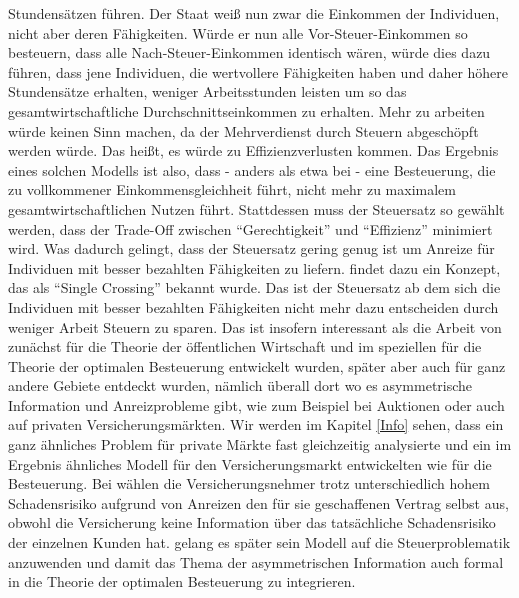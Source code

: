 Stundensätzen führen. Der Staat weiß nun zwar die Einkommen der Individuen, nicht aber deren Fähigkeiten. Würde er nun alle Vor-Steuer-Einkommen so besteuern, dass alle Nach-Steuer-Einkommen identisch wären, würde dies dazu führen, dass jene Individuen, die wertvollere Fähigkeiten haben und daher höhere Stundensätze erhalten, weniger Arbeitsstunden leisten um so das gesamtwirtschaftliche Durchschnittseinkommen zu erhalten. Mehr zu arbeiten würde keinen Sinn machen, da der Mehrverdienst durch Steuern abgeschöpft werden würde. Das heißt, es würde zu Effizienzverlusten kommen. Das Ergebnis eines solchen Modells ist also, dass - anders als etwa bei \Textcite{Pigou1920} - eine Besteuerung, die zu vollkommener Einkommensgleichheit führt, nicht mehr zu maximalem gesamtwirtschaftlichen Nutzen führt. Stattdessen muss der Steuersatz so gewählt werden, dass der Trade-Off zwischen "`Gerechtigkeit"' und "`Effizienz"' minimiert wird. Was dadurch gelingt, dass der Steuersatz gering genug ist um Anreize für Individuen mit besser bezahlten Fähigkeiten zu liefern. \textcite{Mirrlees1971} findet dazu ein Konzept, das als "`Single Crossing"' bekannt wurde. Das ist der Steuersatz ab dem sich die Individuen mit besser bezahlten Fähigkeiten nicht mehr dazu entscheiden durch weniger Arbeit Steuern zu sparen. Das ist insofern interessant als die Arbeit von \textcite{Mirrlees1971} zunächst für die Theorie der öffentlichen Wirtschaft und im speziellen für die Theorie der optimalen Besteuerung entwickelt wurden, später aber auch für ganz andere Gebiete entdeckt wurden, nämlich überall dort wo es asymmetrische Information und Anreizprobleme gibt, wie zum Beispiel bei Auktionen oder auch auf privaten Versicherungsmärkten. Wir werden im Kapitel \ref{Info} sehen, dass \textcite{Akerlof1970} ein ganz ähnliches Problem für private Märkte fast gleichzeitig analysierte und \textcite{Stiglitz1976a} ein im Ergebnis ähnliches Modell für den Versicherungsmarkt entwickelten wie \textcite{Mirrlees1971} für die Besteuerung. Bei \textcite{Stiglitz1976a} wählen die Versicherungsnehmer trotz unterschiedlich hohem Schadensrisiko aufgrund von Anreizen den für sie geschaffenen Vertrag selbst aus, obwohl die Versicherung keine Information über das tatsächliche Schadensrisiko der einzelnen Kunden hat. \textcite{Stiglitz1982} gelang es später sein Modell auf die Steuerproblematik anzuwenden und damit das Thema der asymmetrischen Information auch formal in die Theorie der optimalen Besteuerung zu integrieren.

